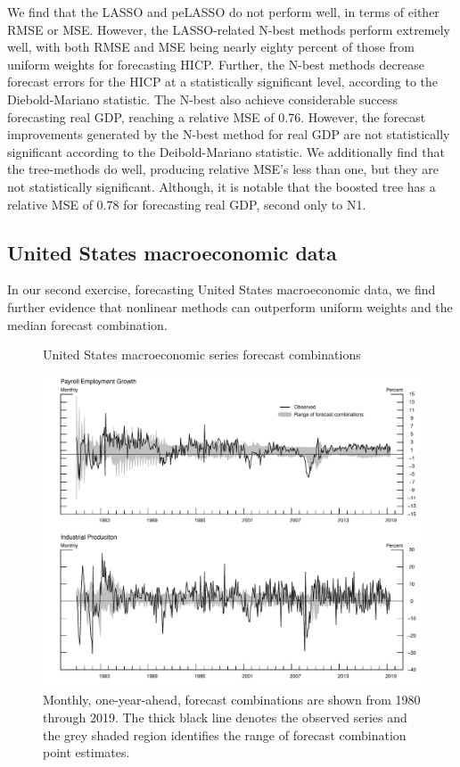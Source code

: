 \documentclass[12pt]{article}
\begin{document}
We find that the LASSO and peLASSO do not perform well, in terms of either RMSE or MSE. However, the LASSO-related N-best methods perform extremely well, with both RMSE and MSE being nearly eighty percent of those from uniform weights for forecasting HICP. Further, the N-best methods decrease forecast errors for the HICP at a statistically significant level, according to the Diebold-Mariano statistic. The N-best also achieve considerable success forecasting real GDP, reaching a relative MSE of 0.76. However, the forecast improvements generated by the N-best method for real GDP are not statistically significant according to the Deibold-Mariano statistic. We additionally find that the tree-methods do well, producing relative MSE's less than one, but they are not statistically significant. Although, it is notable that the boosted tree has a relative MSE of 0.78 for forecasting real GDP, second only to N1.   

\subsection{United States macroeconomic data}
In our second exercise, forecasting United States macroeconomic data, we find further evidence that nonlinear methods can outperform uniform weights and the median forecast combination. 

\begin{figure}[!htb]
\caption{United States macroeconomic series forecast combinations}\label{fig:USAForecast}
\includegraphics[width = .95\textwidth]{usaForecastChart_shaded.pdf}
\caption*{Monthly, one-year-ahead, forecast combinations are shown from 1980 through 2019. The thick black line denotes the observed series and the grey shaded region identifies the range of forecast combination point estimates.}
\end{figure}
\end{document}
